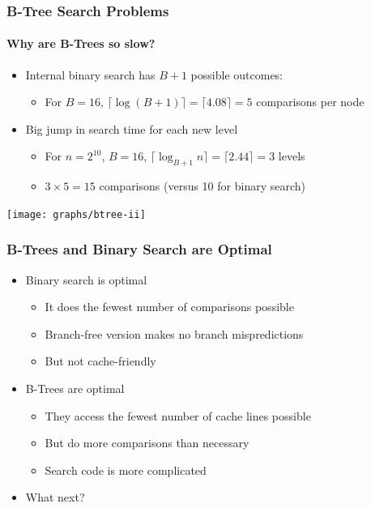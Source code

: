 \documentclass[xcolor=dvipsnames]{beamer}
\begin{document}
\begin{frame}
   \frametitle{B-Tree Search Problems}
   \framesubtitle{Why are B-Trees so slow?}
    
   \begin{itemize}
      \item<+->Internal binary search has $B+1$ possible outcomes:
      \begin{itemize}
        \item<+->For $B=16$, 
                  $\lceil\log(B+1)\rceil = \lceil 4.08\rceil = 5$ comparisons per node
      \end{itemize}
      \item<+->Big jump in search time for each new level 
      \begin{itemize}
        \item<+->For $n=2^{10}$, $B=16$, 
                  $\lceil\log_{B+1}n\rceil = \lceil 2.44\rceil = 3$ levels
        \item<+->$3\times 5 = 15$ comparisons (versus 10 for binary search)
      \end{itemize}
   \end{itemize}
   \begin{center}
      \texttt{[image: graphs/btree-ii]}
   \end{center}
\end{frame}


\begin{frame}
   \frametitle{B-Trees and Binary Search are Optimal}

   \begin{itemize}[<+->]
     \item Binary search is optimal 
     \begin{itemize}
       \item It does the fewest number of comparisons possible
       \item Branch-free version makes no branch mispredictions
       \item But not cache-friendly
     \end{itemize}
     \item B-Trees are optimal
     \begin{itemize}
       \item They access the fewest number of cache lines possible
       \item But do more comparisons than necessary
       \item Search code is more complicated
     \end{itemize}
     \item What next?
   \end{itemize}
\end{frame}
\end{document}
